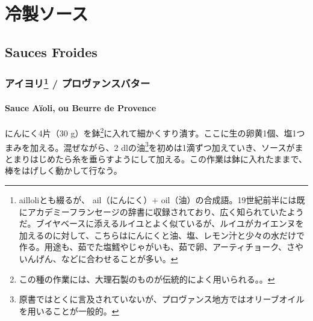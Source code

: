 \hypertarget{ux51b7ux88fdux30bdux30fcux30b9}{%
\section{冷製ソース}\label{ux51b7ux88fdux30bdux30fcux30b9}}

\hypertarget{sauces-froides}{%
\subsection{Sauces Froides}\label{sauces-froides}}

\begin{recette}
\hypertarget{ux30a2ux30a4ux30e8ux30ea2-ux30d7ux30edux30f4ux30a1ux30f3ux30b9ux30d0ux30bfux30fc}{%
\subsubsection[アイヨリ /
プロヴァンスバター]{\texorpdfstring{アイヨリ\footnote{ailloliとも綴るが、
  ail（にんにく）+
  oil（油）の合成語。19世紀前半には既にアカデミーフランセージの辞書に収録されており、広く知られていたようだ。ブイヤベースに添えるルイユとよく似ているが、ルイユがカイエンヌを加えるのに対して、こちらはにんにくと油、塩、レモン汁と少々の水だけで作る。用途も、茹でた塩鱈やじゃがいも、茹で卵、アーティチョーク、さやいんげん、などに合わせることが多い。}
/
プロヴァンスバター}{アイヨリ / プロヴァンスバター}}\label{ux30a2ux30a4ux30e8ux30ea2-ux30d7ux30edux30f4ux30a1ux30f3ux30b9ux30d0ux30bfux30fc}}

\hypertarget{sauce-aioli}{%
\paragraph{Sauce Aïoli, ou Beurre de Provence}\label{sauce-aioli}}


にんにく4片（30 g）を鉢\footnote{この種の作業には、大理石製のものが伝統的によく用いられる。。}に入れて細かくすり潰す。ここに生の卵黄1個、塩1つまみを加える。混ぜながら、2\undemi{}
dlの油\footnote{原書ではとくに言及されていないが、プロヴァンス地方ではオリーブオイルを用いることが一般的。}を初めは1滴ずつ加えていき、ソースがまとまりはじめたら糸を垂らすようにして加える。この作業は鉢に入れたままで、棒をはげしく動かして行なう。


\end{recette}

